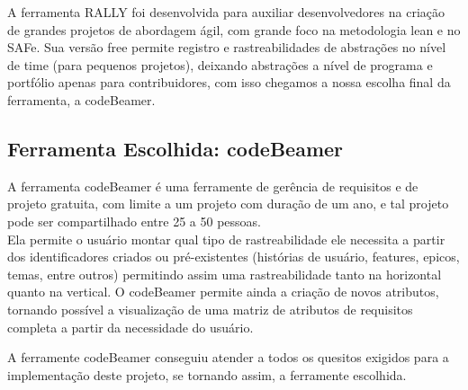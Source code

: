 		A ferramenta RALLY foi desenvolvida para auxiliar desenvolvedores na criação de grandes projetos de abordagem ágil, com grande foco na metodologia lean e no SAFe. Sua versão free permite registro e rastreabilidades de abstrações no nível de time (para pequenos projetos), deixando abstrações a nível de programa e portfólio apenas para contribuidores, com isso chegamos a nossa escolha final da ferramenta, a codeBeamer.

	\subsection{Ferramenta Escolhida: codeBeamer}
		A ferramenta codeBeamer é uma ferramente de gerência de requisitos e de projeto gratuita, com limite a um projeto com duração de um ano, e tal projeto pode ser compartilhado entre 25 a 50 pessoas.
		\\Ela permite o usuário montar qual tipo de rastreabilidade ele necessita a partir dos identificadores criados ou pré-existentes (histórias de usuário, features, epicos, temas, entre outros) permitindo assim uma rastreabilidade tanto na horizontal quanto na vertical.
		O codeBeamer permite ainda a criação de novos atributos, tornando possível a visualização de uma matriz de atributos de requisitos completa a partir da necessidade do usuário.
		\par A ferramente codeBeamer conseguiu atender a todos os quesitos exigidos para a implementação deste projeto, se tornando assim, a ferramente escolhida.
